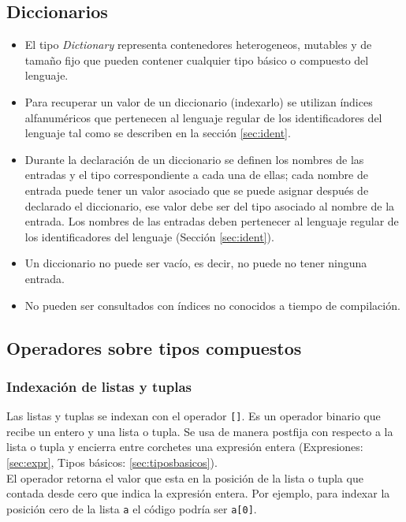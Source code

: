 \documentclass[12pt, spanish]{report}
\begin{document}
\subsection{Diccionarios}
\label{sec:dics}
\begin{itemize}
\item El tipo \emph{Dictionary} representa contenedores heterogeneos,
  mutables y de tama\~no fijo que pueden contener cualquier tipo
  b\'asico o compuesto del lenguaje.
\item Para recuperar un valor de un diccionario (indexarlo) se
  utilizan \'indices alfanum\'ericos que pertenecen al lenguaje
  regular de los identificadores del lenguaje tal como se describen en
  la secci\'on \ref{sec:ident}.
\item Durante la declaraci\'on de un diccionario se definen los
  nombres de las entradas y el tipo correspondiente a cada una de
  ellas; cada nombre de entrada puede tener un valor asociado que se
  puede asignar despu\'es de declarado el diccionario, ese valor debe
  ser del tipo asociado al nombre de la entrada. Los nombres de las
  entradas deben pertenecer al lenguaje regular de los identificadores
  del lenguaje (Secci\'on \ref{sec:ident}).
\item Un diccionario no puede ser vac\'io, es decir, no puede no tener
  ninguna entrada.
\item No pueden ser consultados con \'indices no conocidos a tiempo de
  compilaci\'on.
\end{itemize}

\subsection{Operadores sobre tipos compuestos}

\subsubsection{Indexaci\'on de listas y tuplas}
\label{sec:index_list}
Las listas y tuplas se indexan con el operador \texttt{[]}.
Es un operador binario que recibe un entero y una lista o tupla.
Se usa de manera postfija con respecto a la lista o tupla y encierra
entre corchetes una expresi\'on entera (Expresiones: \ref{sec:expr}, 
Tipos b\'asicos: \ref{sec:tiposbasicos}).\\
\indent El operador retorna el valor que esta en la posici\'on
de la lista o tupla que contada desde cero que indica la
expresi\'on entera.
\indent Por ejemplo, para indexar la posici\'on cero
de la lista \texttt{a} el c\'odigo podr\'ia ser \texttt{a[0]}.
\end{document}
